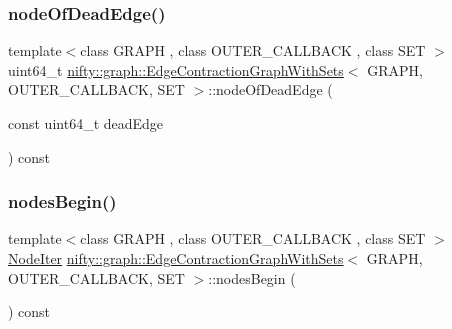 \mbox{\label{classnifty_1_1graph_1_1EdgeContractionGraphWithSets_ab3800af3726fe0fb6b2b4280dd1c58c1}} 
\subsubsection{\texorpdfstring{node\+Of\+Dead\+Edge()}{nodeOfDeadEdge()}}
{\footnotesize\ttfamily template$<$class G\+R\+A\+PH , class O\+U\+T\+E\+R\+\_\+\+C\+A\+L\+L\+B\+A\+CK , class S\+ET $>$ \\
uint64\+\_\+t \hyperlink{classnifty_1_1graph_1_1EdgeContractionGraphWithSets}{nifty\+::graph\+::\+Edge\+Contraction\+Graph\+With\+Sets}$<$ G\+R\+A\+PH, O\+U\+T\+E\+R\+\_\+\+C\+A\+L\+L\+B\+A\+CK, S\+ET $>$\+::node\+Of\+Dead\+Edge (\begin{DoxyParamCaption}\item[{const uint64\+\_\+t}]{dead\+Edge }\end{DoxyParamCaption}) const\hspace{0.3cm}{\ttfamily [inline]}}

\mbox{\label{classnifty_1_1graph_1_1EdgeContractionGraphWithSets_ac092ab91cc82d5d75f19cca3770c33a5}} 
\subsubsection{\texorpdfstring{nodes\+Begin()}{nodesBegin()}}
{\footnotesize\ttfamily template$<$class G\+R\+A\+PH , class O\+U\+T\+E\+R\+\_\+\+C\+A\+L\+L\+B\+A\+CK , class S\+ET $>$ \\
\hyperlink{classnifty_1_1graph_1_1EdgeContractionGraphWithSets_af9e889455b883d034bf708a0b5b05bee}{Node\+Iter} \hyperlink{classnifty_1_1graph_1_1EdgeContractionGraphWithSets}{nifty\+::graph\+::\+Edge\+Contraction\+Graph\+With\+Sets}$<$ G\+R\+A\+PH, O\+U\+T\+E\+R\+\_\+\+C\+A\+L\+L\+B\+A\+CK, S\+ET $>$\+::nodes\+Begin (\begin{DoxyParamCaption}{ }\end{DoxyParamCaption}) const\hspace{0.3cm}{\ttfamily [inline]}}

